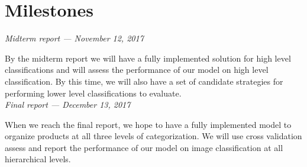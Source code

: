 \documentclass[10pt,twocolumn,letterpaper]{article}
\begin{document}
\section{Milestones}


\textit{Midterm report --- November 12, 2017}

By the midterm report we will have a fully implemented solution for high level classifications and will assess the performance of our model on high level classification.
By this time, we will also have a set of candidate strategies for performing lower level classifications to evaluate.\\


\textit{Final report --- December 13, 2017}

When we reach the final report, we hope to have a fully implemented model to organize products at all three levels of categorization.
We will use cross validation assess and report the performance of our model on image classification at all hierarchical levels.


{\small


}
\end{document}
